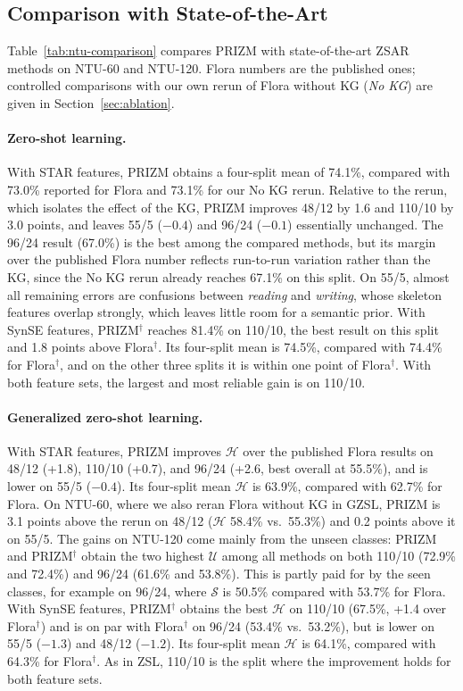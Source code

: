 \documentclass[11pt]{article}
\begin{document}
\subsection{Comparison with State-of-the-Art}

Table~\ref{tab:ntu-comparison} compares PRIZM with state-of-the-art ZSAR methods on NTU-60 and NTU-120. Flora numbers are the published ones; controlled comparisons with our own rerun of Flora without KG (\emph{No KG}) are given in Section~\ref{sec:ablation}.

\paragraph{Zero-shot learning.}
With STAR features, PRIZM obtains a four-split mean of 74.1\%, compared with 73.0\% reported for Flora and 73.1\% for our No KG rerun. Relative to the rerun, which isolates the effect of the KG, PRIZM improves 48/12 by 1.6 and 110/10 by 3.0 points, and leaves 55/5 ($-0.4$) and 96/24 ($-0.1$) essentially unchanged. The 96/24 result (67.0\%) is the best among the compared methods, but its margin over the published Flora number reflects run-to-run variation rather than the KG, since the No KG rerun already reaches 67.1\% on this split. On 55/5, almost all remaining errors are confusions between \emph{reading} and \emph{writing}, whose skeleton features overlap strongly, which leaves little room for a semantic prior. With SynSE features, PRIZM$^\dagger$ reaches 81.4\% on 110/10, the best result on this split and 1.8 points above Flora$^\dagger$. Its four-split mean is 74.5\%, compared with 74.4\% for Flora$^\dagger$, and on the other three splits it is within one point of Flora$^\dagger$. With both feature sets, the largest and most reliable gain is on 110/10.

\paragraph{Generalized zero-shot learning.}
With STAR features, PRIZM improves $\mathcal{H}$ over the published Flora results on 48/12 (+1.8), 110/10 (+0.7), and 96/24 (+2.6, best overall at 55.5\%), and is lower on 55/5 ($-0.4$). Its four-split mean $\mathcal{H}$ is 63.9\%, compared with 62.7\% for Flora. On NTU-60, where we also reran Flora without KG in GZSL, PRIZM is 3.1 points above the rerun on 48/12 ($\mathcal{H}$ 58.4\% vs.\ 55.3\%) and 0.2 points above it on 55/5. The gains on NTU-120 come mainly from the unseen classes: PRIZM and PRIZM$^\dagger$ obtain the two highest $\mathcal{U}$ among all methods on both 110/10 (72.9\% and 72.4\%) and 96/24 (61.6\% and 53.8\%). This is partly paid for by the seen classes, for example on 96/24, where $\mathcal{S}$ is 50.5\% compared with 53.7\% for Flora. With SynSE features, PRIZM$^\dagger$ obtains the best $\mathcal{H}$ on 110/10 (67.5\%, +1.4 over Flora$^\dagger$) and is on par with Flora$^\dagger$ on 96/24 (53.4\% vs.\ 53.2\%), but is lower on 55/5 ($-1.3$) and 48/12 ($-1.2$). Its four-split mean $\mathcal{H}$ is 64.1\%, compared with 64.3\% for Flora$^\dagger$. As in ZSL, 110/10 is the split where the improvement holds for both feature sets.
\end{document}
